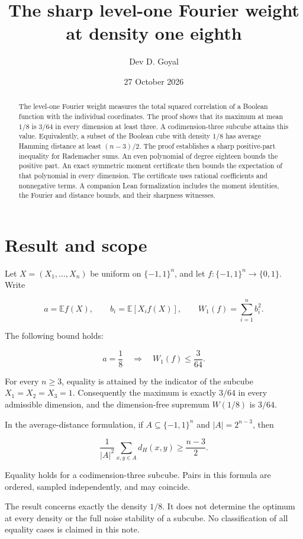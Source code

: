 \documentclass[11pt]{article}
\title{The sharp level-one Fourier weight at density one eighth}
\author{Dev D. Goyal}
\date{27 October 2026}
\begin{document}
\maketitle
\begin{abstract}
The level-one Fourier weight measures the total squared correlation of a Boolean function with the individual coordinates. The proof shows that its maximum at mean $1/8$ is $3/64$ in every dimension at least three. A codimension-three subcube attains this value. Equivalently, a subset of the Boolean cube with density $1/8$ has average Hamming distance at least $(n-3)/2$. The proof establishes a sharp positive-part inequality for Rademacher sums. An even polynomial of degree eighteen bounds the positive part. An exact symmetric moment certificate then bounds the expectation of that polynomial in every dimension. The certificate uses rational coefficients and nonnegative terms. A companion Lean formalization includes the moment identities, the Fourier and distance bounds, and their sharpness witnesses.
\end{abstract}

\hypertarget{result-and-scope}{%
\section{Result and scope}\label{result-and-scope}}

Let \(X=(X_1,\ldots,X_n)\) be uniform on \(\{-1,1\}^n\), and let
\(f:\{-1,1\}^n\to\{0,1\}\). Write

\[a=\mathbb E f(X),\qquad b_i=\mathbb E[X_i f(X)],\qquad W_1(f)=\sum_{i=1}^n b_i^2.\]

The following bound holds:

\[\boxed{a=\frac18\quad\Longrightarrow\quad W_1(f)\le\frac3{64}.} \tag{1}\]

For every \(n\ge3\), equality is attained by the indicator of the
subcube \(X_1=X_2=X_3=1\). Consequently the maximum is exactly \(3/64\)
in every admissible dimension, and the dimension-free supremum
\(W(1/8)\) is \(3/64\).

In the average-distance formulation, if \(A\subseteq\{-1,1\}^n\) and
\(|A|=2^{n-3}\), then

\[\boxed{\frac1{|A|^2}\sum_{x,y\in A}d_H(x,y)\ge\frac{n-3}{2}.} \tag{2}\]

Equality holds for a codimension-three subcube. Pairs in this formula
are ordered, sampled independently, and may coincide.

The result concerns exactly the density \(1/8\). It does not determine
the optimum at every density or the full noise stability of a subcube.
No classification of all equality cases is claimed in this note.
\end{document}
